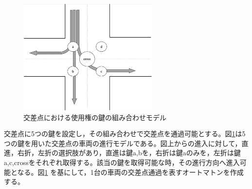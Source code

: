 \documentclass[twocolumn,10pt]{jsarticle}
\begin{document}
	\begin{figure}[htbp]
	\centering
	\includegraphics[width=70mm]{IntersectionM.png}
	\caption{交差点における使用権の鍵の組み合わせモデル}
	\label{IM}
	\end{figure}
	交差点に5つの鍵を設定し，その組み合わせで交差点を通過可能とする。図\ref{IM}は5つの鍵を用いた交差点の車両の進行モデルである。図上からの進入に対して，直進，右折，左折の選択肢があり，直進は鍵a,bを，右折は鍵aのみを，左折は鍵a,c,crossをそれぞれ取得する。該当の鍵を取得可能な時，その進行方向へ進入可能となる。図\ref{IM} を基にして，1台の車両の交差点通過を表すオートマトンを作成する。
\end{document}
